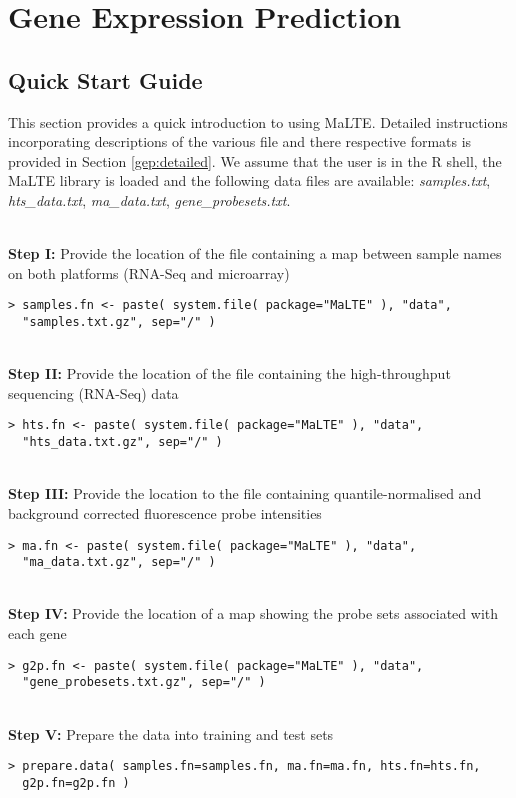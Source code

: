 \documentclass[a4paper,12pt]{article}
\begin{document}
\section{Gene Expression Prediction}
\label{gep}
\subsection{Quick Start Guide}
\label{gep:quick}
This section provides a quick introduction to using \textsf{MaLTE}. Detailed instructions incorporating descriptions of the various file and there respective formats is provided in Section \ref{gep:detailed}. We assume that the user is in the \textsf{R} shell, the \textsf{MaLTE} library is loaded and the following data files are available: \textit{samples.txt}, \textit{hts\_data.txt}, \textit{ma\_data.txt}, \textit{gene\_probesets.txt}.

\noindent\\
\textbf{Step I:} Provide the location of the file containing a map between sample names on both platforms (RNA-Seq and microarray)
\begin{verbatim}
> samples.fn <- paste( system.file( package="MaLTE" ), "data", 
  "samples.txt.gz", sep="/" )
\end{verbatim}

\noindent\\
\textbf{Step II:} Provide the location of the file containing the high-throughput sequencing (RNA-Seq) data
\begin{verbatim}
> hts.fn <- paste( system.file( package="MaLTE" ), "data", 
  "hts_data.txt.gz", sep="/" )
\end{verbatim}

\noindent\\
\textbf{Step III:} Provide the location to the file containing quantile-normalised and background corrected fluorescence probe intensities
\begin{verbatim}
> ma.fn <- paste( system.file( package="MaLTE" ), "data", 
  "ma_data.txt.gz", sep="/" )
\end{verbatim}

\noindent\\
\textbf{Step IV:} Provide the location of a map showing the probe sets associated with each gene
\begin{verbatim}
> g2p.fn <- paste( system.file( package="MaLTE" ), "data", 
  "gene_probesets.txt.gz", sep="/" )
\end{verbatim}

\noindent\\
\textbf{Step V:} Prepare the data into training and test sets
\begin{verbatim}
> prepare.data( samples.fn=samples.fn, ma.fn=ma.fn, hts.fn=hts.fn, 
  g2p.fn=g2p.fn )
\end{verbatim}
\end{document}
